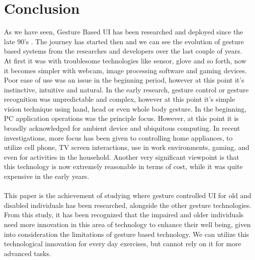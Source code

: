 \documentclass{article}
\begin{document}
\section{Conclusion}
As we have seen, Gesture Based UI has been researched and deployed since the late 90's \cite{de2010language}. The journey has started then and we can see the evolution of gesture based systems from the researches and developers over the last couple of years. At first it was with troublesome technologies like sensor, glove and so forth, now it becomes simpler with webcam, image processing software and gaming devices. Poor ease of use was an issue in the beginning period, however at this point it's instinctive, intuitive and natural.\cite{muller2013body} In the early research, gesture control or gesture recognition was unpredictable and complex, however at this point it's simple vision technique using hand, head or even whole body gesture. In the beginning, PC application operations was the principle focus. However, at this point it is broadly acknowledged for ambient device and ubiquitous computing. In recent investigations, more focus has been given to controlling home appliances, to utilize cell phone, TV screen interactions, use in work environments, gaming, and even for activities in the household. Another very significant viewpoint is that this technology is now extremely reasonable in terms of cost, while it was quite expensive in the early years.
\\\\
This paper is the achievement of studying where gesture controlled UI for old and disabled individuals has been researched, alongside the other gesture technologies. From this study, it has been recognized that the impaired and older individuals need more innovation in this area of technology to enhance their well being, \cite{escalera2017challenges} given into consideration the limitations of gesture based technology. We can utilize this technological innovation for every day exercises, but cannot rely on it for more advanced tasks.




\end{document}
